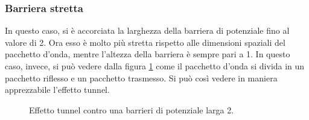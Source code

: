  
 \subsubsection{Barriera stretta}
 In questo caso, si è accorciata la larghezza della barriera di potenziale fino al valore di 2. Ora esso è molto più stretta rispetto alle dimensioni spaziali del pacchetto d'onda, mentre l'altezza della barriera è sempre pari a 1. In questo caso, invece, 
si può vedere dalla figura \ref{fig:tunnel} come il pacchetto d'onda si divida in un pacchetto riflesso e un pacchetto trasmesso. Si può così vedere in maniera
apprezzabile l'effetto tunnel.
\begin{figure}[hp]
 \centering
  \caption{\small{Effetto tunnel contro una barrieri di potenziale larga 2.}}
\label{fig:tunnel}
  \end{figure}
